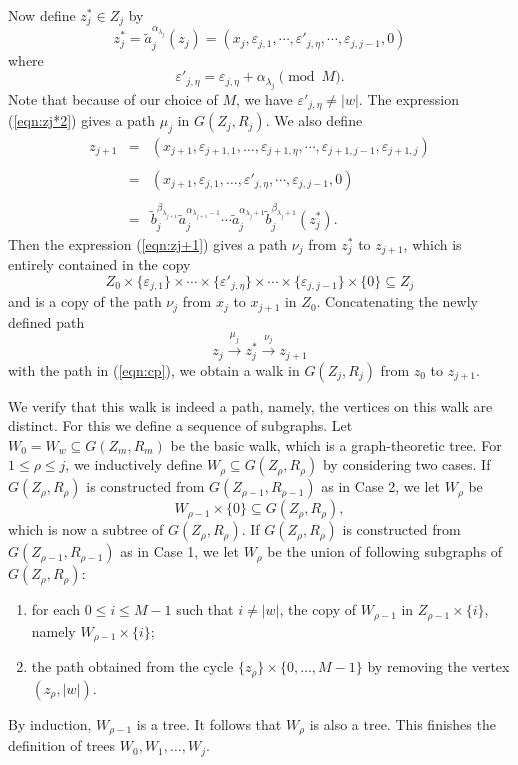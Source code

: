 \documentclass[10pt,a4paper]{amsart}
\theoremstyle{definition}
\theoremstyle{definition}
\numberwithin{equation}{section}
\begin{document}
Now define $z_j^*\in Z_j$ by
\begin{equation}\label{eqn:zj*2} z_j^*=\tilde{a}_j^{\alpha_{\lambda_j}}(z_j)=(x_j, \varepsilon_{j,1}, \cdots, \varepsilon'_{j,\eta}, \cdots, \varepsilon_{j,j-1}, 0) \end{equation}
where
$$\varepsilon'_{j, \eta}=\varepsilon_{j, \eta}+\alpha_{\lambda_j}\pmod{M}. $$
Note that because of our choice of $M$, we have $\varepsilon'_{j, \eta}\neq |w|$. The expression (\ref{eqn:zj*2}) gives a path $\mu_j$ in $G(Z_j, R_j)$. We also define
\begin{equation}\label{eqn:zj+1} \begin{array}{rcl}
z_{j+1}&=&(x_{j+1}, \varepsilon_{j+1,1}, \dots,  \varepsilon_{j+1,\eta}, \cdots, \varepsilon_{j+1, j-1},\varepsilon_{j+1,j}) \\ \\
&=&(x_{j+1}, \varepsilon_{j,1}, \dots,  \varepsilon'_{j,\eta}, \cdots, \varepsilon_{j, j-1},0) \\ \\
&=&\tilde{b}_j^{\beta_{\lambda_{j+1}}}\tilde{a}_j^{\alpha_{\lambda_{j+1}-1}}\cdots\tilde{a}_j^{\alpha_{\lambda_{j}+1}}\tilde{b}_j^{\beta_{\lambda_{j}+1}}(z_j^*). 
\end{array}\end{equation}
Then the expression (\ref{eqn:zj+1}) gives a path $\nu_j$ from $z_j^*$ to $z_{j+1}$, which is entirely contained in the copy
$$ Z_0\times \{\varepsilon_{j,1}\}\times \cdots\times \{\varepsilon'_{j,\eta}\}\times  \cdots\times\{ \varepsilon_{j, j-1}\}\times \{0\}\subseteq Z_j $$
and is a copy of the path $\nu_j$ from $x_j$ to $x_{j+1}$ in $Z_0$. Concatenating the newly defined path
$$ z_j\stackrel{\mu_j}{\longrightarrow} z_j^*\stackrel{\nu_j}{\longrightarrow} z_{j+1} $$
with the path in (\ref{eqn:cp}), we obtain a walk in $G(Z_j, R_j)$ from $z_0$ to $z_{j+1}$. 

We verify that this walk is indeed a path, namely, the vertices on this walk are distinct. For this we define a sequence of subgraphs. Let $W_0=W_w\subseteq G(Z_m, R_m)$ be the basic walk, which is a graph-theoretic tree. For $1\leq \rho\leq j$, we inductively define $W_\rho\subseteq G(Z_\rho, R_\rho)$ by considering two cases.  If $G(Z_{\rho}, R_{\rho})$ is constructed from $G(Z_{\rho-1}, R_{\rho-1})$ as in Case 2, we let $W_\rho$ be 
$$ W_{\rho-1}\times\{0\}\subseteq G(Z_{\rho}, R_\rho), $$
which is now a subtree of $G(Z_{\rho}, R_{\rho})$. If $G(Z_{\rho}, R_{\rho})$ is constructed from $G(Z_{\rho-1}, R_{\rho-1})$ as in Case 1, we let $W_\rho$ be the union of following subgraphs of $G(Z_\rho, R_\rho)$:
\begin{enumerate}
\item[(a)] for each $0\leq i\leq M-1$ such that $i\neq |w|$, the copy of $W_{\rho-1}$ in $Z_{\rho-1}\times \{i\}$, namely $W_{\rho-1}\times\{i\}$;
\item[(b)] the path obtained from the cycle $\{z_\rho\}\times \{0, \dots, M-1\}$ by removing the vertex $(z_\rho, |w|)$.
\end{enumerate}
By induction, $W_{\rho-1}$ is a tree. It follows that $W_\rho$ is also a tree. This finishes the definition of trees $W_0, W_1, \dots, W_j$. 
\end{document}
